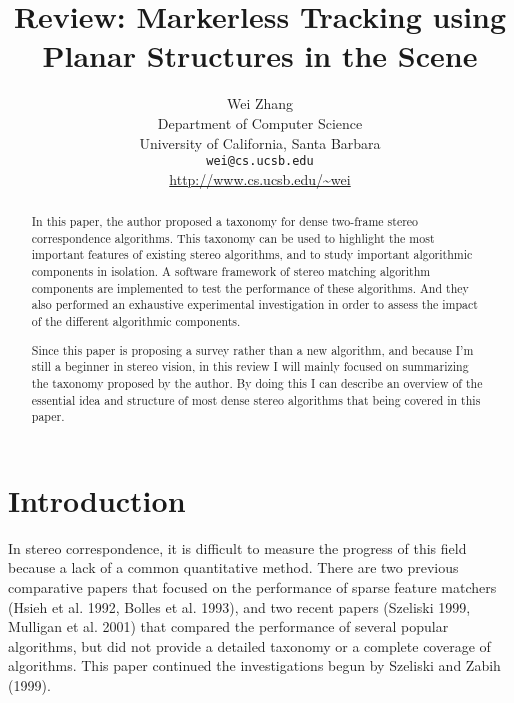\documentclass[10pt,twocolumn,letterpaper]{article}
\begin{document}
\title{Review: Markerless Tracking using Planar Structures in the Scene}

\author{Wei Zhang\\
Department of Computer Science\\
University of California, Santa Barbara\\
{\tt\small wei@cs.ucsb.edu}\\
{\small\url{http://www.cs.ucsb.edu/~wei}}
}

\maketitle
\thispagestyle{empty}

\begin{abstract}
In this paper, the author
proposed a taxonomy for dense two-frame stereo correspondence algorithms.
This taxonomy can be used to highlight the 
most important features of existing stereo algorithms,
and to study important algorithmic components in isolation. 
A software framework of stereo
matching algorithm components are implemented to test the performance 
of these algorithms.
And they also performed an exhaustive experimental investigation in
order to assess the impact of the different algorithmic components. 

Since this paper is proposing a survey rather than a new algorithm, 
and because I'm still a beginner in stereo vision, 
in this review I will mainly focused on summarizing the taxonomy proposed by the author.
By doing this I can describe an overview
of the essential idea and structure of most dense stereo algorithms
that being covered in this paper.
\end{abstract}

\section{Introduction}
In stereo correspondence, it is difficult to measure the progress of this field
because a lack of a common quantitative method. There are two previous 
comparative papers that focused on the performance of
sparse feature matchers (Hsieh et al. 1992, Bolles et al. 1993), 
and two recent papers (Szeliski 1999,
Mulligan et al. 2001) that compared the performance of
several popular algorithms, but did not provide a detailed taxonomy 
or a complete coverage of algorithms.
This paper continued the investigations begun by Szeliski and Zabih (1999).
\end{document}
